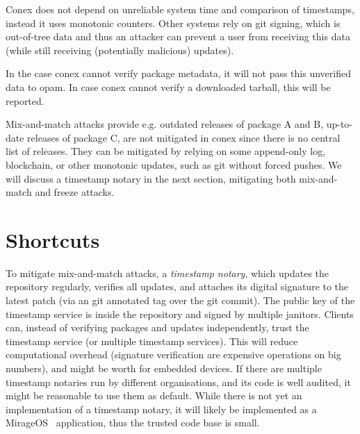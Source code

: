 \documentclass[nocopyrightspace]{sigplanconf}
\newcommand{\TODO}[1]{\textbf{[TODO: #1]}}
\begin{document}
Conex does not depend on unreliable system time and comparison of timestamps, instead it uses monotonic counters.
Other systems rely on git signing, which is out-of-tree data and thus an attacker can prevent a user from receiving this data (while still receiving (potentially malicious) updates).

In the case conex cannot verify package metadata, it will not pass this unverified data to opam.
In case conex cannot verify a downloaded tarball, this will be reported.

Mix-and-match attacks provide e.g. outdated releases of package A and B, up-to-date releases of package C, are not mitigated in conex since there is no central list of releases.
They can be mitigated by relying on some append-only log, blockchain, or other monotonic updates, such as git without forced pushes.
We will discuss a timestamp notary in the next section, mitigating both mix-and-match and freeze attacks.

\section{Shortcuts} \label{sec:shortcuts}


To mitigate mix-and-match attacks, a \emph{timestamp notary}, which updates the repository regularly, verifies all updates, and attaches its digital signature to the latest patch (via an git annotated tag over the git commit).
The public key of the timestamp service is inside the repository and signed by multiple janitors.
Clients can, instead of verifying packages and updates independently, trust the timestamp service (or multiple timestamp services).
This will reduce computational overhead (signature verification are expensive operations on big numbers), and might be worth for embedded devices.
If there are multiple timestamp notaries run by different organisations, and its code is well audited, it might be reasonable to use them as default.
While there is not yet an implementation of a timestamp notary, it will likely be implemented as a MirageOS~\cite{mirage,nqsb-tls} application, thus the trusted code base is small.
\end{document}
